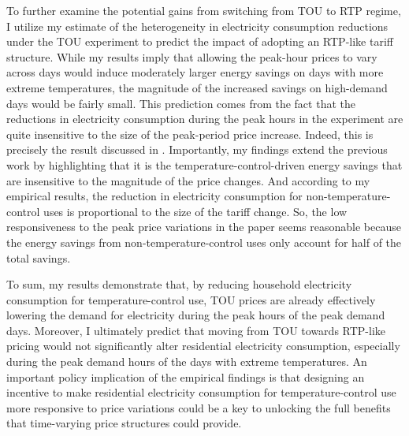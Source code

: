 To further examine the potential gains from switching from TOU to RTP regime, I utilize my estimate of the heterogeneity in electricity consumption reductions under the TOU experiment to predict the impact of adopting an RTP-like tariff structure. While my results imply that allowing the peak-hour prices to vary across days would induce moderately larger energy savings on days with more extreme temperatures, the magnitude of the increased savings on high-demand days would be fairly small. This prediction comes from the fact that the reductions in electricity consumption during the peak hours in the experiment are quite insensitive to the size of the peak-period price increase. Indeed, this is precisely the result discussed in \cite{Peaking-Interest:How-Awareness-Drives-the-Effectiveness-of-Time-of-Use-Electricity-Pricing}. Importantly, my findings extend the previous work by highlighting that it is the temperature-control-driven energy savings that are insensitive to the magnitude of the price changes. And according to my empirical results, the reduction in electricity consumption for non-temperature-control uses is proportional to the size of the tariff change. So, the low responsiveness to the peak price variations in the paper seems reasonable because the energy savings from non-temperature-control uses only account for half of the total savings.

To sum, my results demonstrate that, by reducing household electricity consumption for temperature-control use, TOU prices are already effectively lowering the demand for electricity during the peak hours of the peak demand days. Moreover, I ultimately predict that moving from TOU towards RTP-like pricing would not significantly alter residential electricity consumption, especially during the peak demand hours of the days with extreme temperatures. An important policy implication of the empirical findings is that designing an incentive to make residential electricity consumption for temperature-control use more responsive to price variations could be a key to unlocking the full benefits that time-varying price structures could provide.
